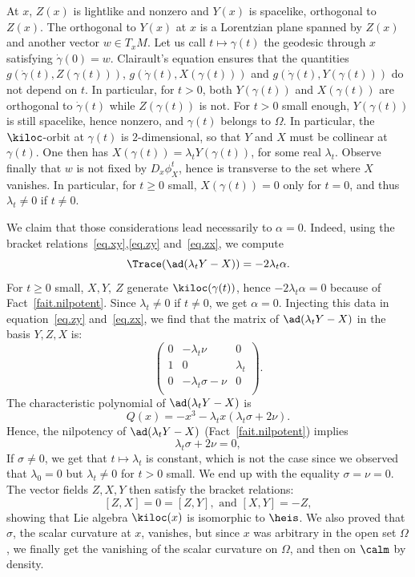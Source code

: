 At $x$, $Z(x)$ is lightlike and nonzero and $Y(x)$ is spacelike, orthogonal to $Z(x)$. The orthogonal to $Y(x)$ at $x$ is a Lorentzian plane spanned by $Z(x)$ and another vector $w \in T_xM$. Let us call $t \mapsto \gamma(t)$ the geodesic through $x$ satisfying $\dot{\gamma}(0)=w$. Clairault's equation ensures that the quantities $g(\dot{\gamma}(t),Z(\gamma(t)))$, $g(\dot{\gamma}(t),X(\gamma(t)))$ and $g(\dot{\gamma}(t),Y(\gamma(t)))$ do not depend on $t$. In particular, for $t>0$, both $Y(\gamma(t))$ and $X(\gamma(t))$ are orthogonal to $\dot{\gamma}(t)$ while $Z(\gamma(t))$ is not. For $t>0$ small enough, $Y(\gamma(t))$ is still spacelike, hence nonzero, and $\gamma(t)$ belongs to $\Omega$. In particular, the $\kiloc$-orbit at $\gamma(t)$ is $2$-dimensional, so that $Y$ and $X$ must be collinear at $\gamma(t)$. One then has $X(\gamma(t))=\lambda_t Y(\gamma(t))$, for some real $\lambda_t$. Observe finally that $w$ is not fixed by $D_x\phi_X^t$, hence is transverse to the set where $X$ vanishes. In particular, for $t \geq 0$ small, $X(\gamma(t))=0$ only for $t = 0$, and thus $\lambda_t \not =0$ if $t \not =0$.


We claim that those considerations lead necessarily to $\alpha=0$. Indeed, using the bracket relations~\eqref{eq.xy},\eqref{eq.zy} and~\eqref{eq.zx}, we compute
\[
\Trace(\ad(\lambda_t Y - X))=-2 \lambda_t \alpha.
\]
For $t \geq 0$ small, $X,Y,\ Z$ generate $\kiloc(\gamma(t))$, hence $-2 \lambda_t \alpha=0$ because of Fact~\ref{fait.nilpotent}. Since $\lambda_t \not = 0$ if $t \not =0$, we get $\alpha=0$. Injecting this data in equation~\eqref{eq.zy} and~\eqref{eq.zx}, we find that the matrix of $\ad(\lambda_t Y - X)$ in the basis $Y,Z,X$ is:
\[
\begin{pmatrix}
0 & -\lambda_t \nu &0\\
1 & 0 & \lambda_t\\
0 & -\lambda_t \sigma -\nu & 0\\
\end{pmatrix}.
\]
The characteristic polynomial of $\ad(\lambda_t Y - X)$ is
\[
Q(x)=-x^3-\lambda_t x(\lambda_t \sigma + 2 \nu).
\]
Hence, the nilpotency of $\ad(\lambda_t Y - X)$ (Fact~\ref{fait.nilpotent}) implies
\begin{equation}\label{eq.relation}
\lambda_t \sigma + 2 \nu=0,
\end{equation}
If $\sigma \not =0$, we get that $t \mapsto \lambda_t$ is constant, which is not the case since we observed that $\lambda_0=0$ but $\lambda_t \not =0$ for $t>0$ small. We end up with the equality $\sigma=\nu=0$. The vector fields $Z,X,Y$ then satisfy the bracket relations:
\[
[Z,X]=0=[Z,Y], \text{ and } [X,Y]=-Z,
\]
showing that Lie algebra $\kiloc(x)$ is isomorphic to $\heis$. We also proved that $\sigma$, the scalar curvature at $x$, vanishes, but since $x$ was arbitrary in the open set $\Omega$, we finally get the vanishing of the scalar curvature on $\Omega$, and then on $\calm$ by density.


